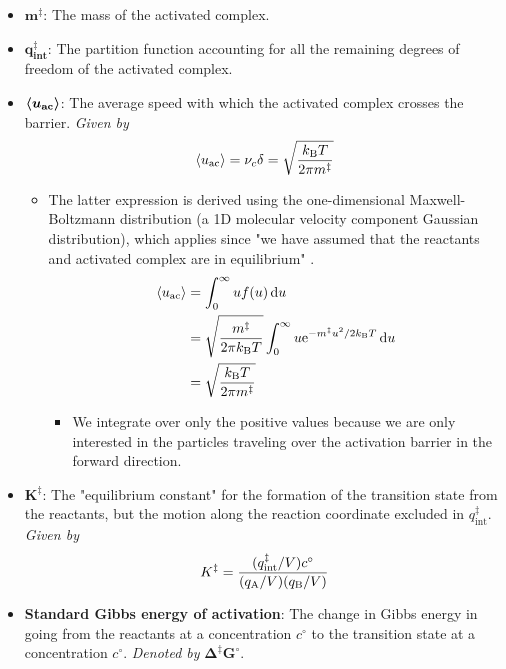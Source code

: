 \documentclass[../notes.tex]{subfiles}
\begin{document}
\begin{itemize}
    \item $\bm{m^\ddagger}$: The mass of the activated complex.
    \item $\bm{q_\textbf{int}^\ddagger}$: The partition function accounting for all the remaining degrees of freedom of the activated complex.
    \item $\bm{\prb{u_\textbf{ac}}}$: The average speed with which the activated complex crosses the barrier. \emph{Given by}
    \begin{equation*}
        \prb{u_\text{ac}} = \nu_c\delta
        = \sqrt{\frac{\kB T}{2\pi m^\ddagger}}
    \end{equation*}
    \begin{itemize}
        \item The latter expression is derived using the one-dimensional Maxwell-Boltzmann distribution (a 1D molecular velocity component Gaussian distribution), which applies since "we have assumed that the reactants and activated complex are in equilibrium" \parencite[1167]{bib:McQuarrieSimon}.
        \begin{align*}
            \prb{u_\text{ac}} &= \int_0^\infty uf(u)\dd{u}\\
            &= \sqrt{\frac{m^\ddagger}{2\pi\kB T}}\int_0^\infty u\e[-m^\ddagger u^2/2\kB T]\dd{u}\\
            &= \sqrt{\frac{\kB T}{2\pi m^\ddagger}}
        \end{align*}
        \begin{itemize}
            \item We integrate over only the positive values because we are only interested in the particles traveling over the activation barrier in the forward direction.
        \end{itemize}
    \end{itemize}
    \item $\bm{K^\ddagger}$: The "equilibrium constant" for the formation of the transition state from the reactants, but the motion along the reaction coordinate excluded in $q_\text{int}^\ddagger$. \emph{Given by}
    \begin{equation*}
        K^\ddagger = \frac{(q_\text{int}^\ddagger/V)c^\circ}{(q_{\ce{A}}/V)(q_{\ce{B}}/V)}
    \end{equation*}
    \item \textbf{Standard Gibbs energy of activation}: The change in Gibbs energy in going from the reactants at a concentration $c^\circ$ to the transition state at a concentration $c^\circ$. \emph{Denoted by} $\bm{\Delta^\ddagger G^\circ}$.

\end{itemize}
\end{document}
